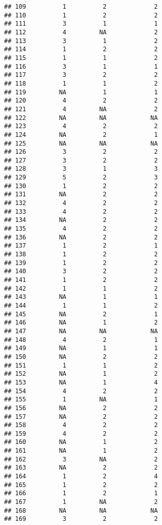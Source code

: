 \documentclass[
]{article}
\begin{document}
\begin{verbatim}
## 109          1          2             2
## 110          1          2             2
## 111          3          1             1
## 112          4         NA             2
## 113          3          1             2
## 114          1          2             2
## 115          1          1             2
## 116          3          1             1
## 117          3          2             2
## 118          1          1             2
## 119         NA          1             1
## 120          4          2             2
## 121          4         NA             2
## 122         NA         NA            NA
## 123          4          2             2
## 124         NA          2             1
## 125         NA         NA            NA
## 126          3          2             2
## 127          3          2             2
## 128          3          1             3
## 129          5          2             3
## 130          1          2             2
## 131         NA          2             2
## 132          4          2             2
## 133          4          2             2
## 134         NA          2             2
## 135          4          2             2
## 136         NA          2             2
## 137          1          2             1
## 138          1          2             2
## 139          1          2             2
## 140          3          2             2
## 141          1          2             2
## 142          1          1             2
## 143         NA          1             1
## 144          1          1             2
## 145         NA          2             1
## 146         NA          1             2
## 147         NA         NA            NA
## 148          4          2             1
## 149         NA          1             1
## 150         NA          2             2
## 151          1          1             2
## 152         NA          1             2
## 153         NA          1             4
## 154          4          2             2
## 155          1         NA             1
## 156         NA          2             2
## 157         NA          2             2
## 158          4          2             2
## 159          4          2             2
## 160         NA          1             2
## 161         NA          1             2
## 162          3         NA             2
## 163         NA          2             2
## 164          1          2             4
## 165          1          2             2
## 166          1          2             1
## 167          1         NA             2
## 168         NA         NA            NA
## 169          3          2             2

\end{verbatim}
\end{document}
